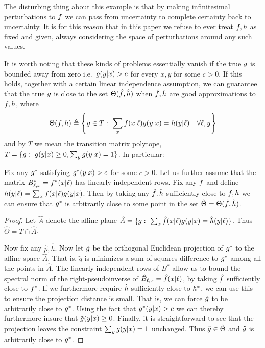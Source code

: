 The disturbing thing about this example is that by making infinitesimal perturbations to $f$ we can pass from uncertainty to complete certainty back to uncertainty.  It is for this reason that in this paper we refuse to ever treat $f,h$ as fixed and given, always considering the space of perturbations around any such values.  

It is worth noting that these kinds of problems essentially vanish if the true $g$ is bounded away from zero i.e.\ $g(y|x)>c$ for every $x,y$ for some $c>0$.  If this holds, together with a certain linear independence assumption, we can guarantee that the true $g$ is close to the set $\Theta(\hat {f},\hat {h})$ when $\hat {f},\hat {h}$ are good approximations to $f,h$, where
\[
\Theta(\plx,\ply) \triangleq \left\{\pxy\in T:\ \sum_x \plx(x|\ell)\pxy(y|x)= \ply(y|\ell) \quad \forall \ell,y \right\}
\]
and by $T$ we mean the transition matrix polytope, $T=\{g:\ g(y|x)\geq 0, \sum_y g(y|x)=1\}$.  In particular:\vspace{.1in}

\begin{thm}\label{thm:mainthm}
Fix any $g^*$ satisfying $g^*(y|x)>c$ for some $c>0$.  Let us further assume that the matrix $B^*_{\ell,x}=f^*(x|\ell)$ has linearly independent rows.  Fix any $f$ and define $h(y|\ell)=\sum_x f(x|\ell)g(y|x)$.  Then by taking any $\hat {f},\hat {h}$ sufficiently close to $f,h$ we can ensure that $g^*$ is arbitrarily close to some point in the set $\hat \Theta = \Theta(\hat {f},\hat {h})$.
\end{thm}
\begin{proof}
Let $\hat A$ denote the affine plane $\hat A=\{\pxy:\ \sum_x \hat \plx(x|\ell)\pxy(y|x)= \hat \ply(y|\ell)\}$.  Thus $\hat \Theta = T \cap \hat A$.

Now fix any $\hat p,\hat h$.  Now let $\tilde {g}$ be the orthogonal Euclidean projection of $g^*$ to the affine space $\hat A$.  That is, $\tilde q$ is minimizes a sum-of-squares difference to $g^*$ among all the points in $\hat A$.  The linearly independent rows of $B^*$ allow us to bound the spectral norm of the right-pseudoinverse of $\hat B_{\ell,x}=\hat {f}(x|\ell)$, by taking $\hat {f}$ sufficiently close to $f^*$.  If we furthermore require $\hat {h}$ sufficiently close to $h^*$, we can use this to ensure the projection distance is small.  That is, we can force $\tilde {g}$ to be arbitrarily close to $g^*$.  Using the fact that $g^*(y|x)>c$ we can thereby furthermore insure that $\tilde {g}(y|x)\geq0$.  Finally, it is straightforward to see that the projection leaves the constraint $\sum_y g(y|x)=1$ unchanged.  Thus $\tilde {g}\in \hat \Theta$ and $\tilde {g}$ is arbitrarily close to $g^*$. 
\end{proof}

